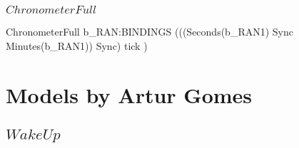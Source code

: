 \subsubsection{$ChronometerFull$}

\begin{circus}
  \circprocess ChronometerFull \circdef b\_RAN:BINDINGS \circspot (((Seconds(b\_RAN1) \lpar Sync \rpar Minutes(b\_RAN1)) \circhide Sync) \circhide \lchanset tick \rchanset)
\end{circus}
%
\section{Models by Artur Gomes}

\subsection{$WakeUp$}

